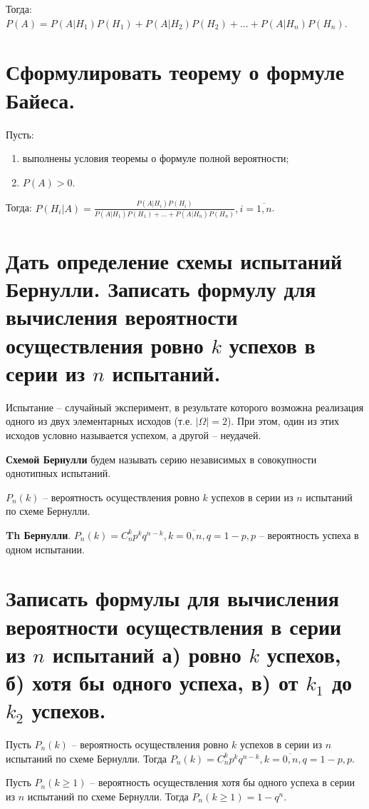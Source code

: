 Тогда: $P(A) = P(A|H_1)P(H_1) + P(A|H_2)P(H_2) + ... + P(A|H_n)P(H_n)$.

\section{Сформулировать теорему о формуле Байеса.}

Пусть:
\begin{enumerate}
	\item выполнены условия теоремы о формуле полной вероятности;
	\item $P(A) > 0$.
\end{enumerate}

Тогда: $P(H_i|A) = \frac{P(A|H_i)P(H_i)}{P(A|H_1)P(H_1) + ... + P(A|H_n)P(H_n)} , i = \overline{1, n}$.

\section{Дать определение схемы испытаний Бернулли. Записать формулу для вычисления вероятности осуществления ровно $k$ успехов в серии из $n$ испытаний.}

Испытание -- случайный эксперимент, в результате которого возможна реализация одного из двух элементарных исходов (т.е. $|\Omega| = 2$). При этом, один из этих исходов условно называется успехом, а другой -- неудачей.

\textbf{Схемой Бернулли} будем называть серию независимых в совокупности однотипных испытаний.

$P_n(k)$ -- вероятность осуществления ровно $k$ успехов в серии из $n$ испытаний по схеме Бернулли.

\textbf{Th Бернулли}. $P_n(k) = C_n^k p^k q^{n-k}, k = \overline{0, n}, q = 1 - p, p$ --  вероятность успеха в одном испытании.

\section{Записать формулы для вычисления вероятности осуществления в серии из $n$ испытаний а) ровно $k$ успехов, б) хотя бы одного успеха, в) от $k_1$ до $k_2$ успехов.}

Пусть $P_n(k)$ -- вероятность осуществления ровно $k$ успехов в серии из $n$ испытаний по схеме Бернулли. Тогда $P_n(k) = C_n^k p^k q^{n-k}, k = \overline{0, n}, q = 1 - p, p$.

Пусть $P_n(k \geq 1)$ -- вероятность осуществления хотя бы одного успеха в серии из $n$ испытаний по схеме Бернулли. Тогда $P_n(k \geq 1) = 1 - q^n$.


